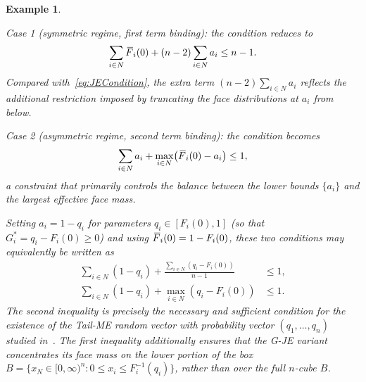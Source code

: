 \documentclass[letterpaper,12pt]{article}
\numberwithin{equation}{section}
\newtheorem{example}[theorem]{Example}
\newcommand{\N}{{N}}
\newcommand{\F}{\,\overline{\kern-0.175em F\kern-0em}}
\begin{document}
{\begin{example}
\begin{itemize}
\noindent\textit{Case 1} (symmetric regime, first term binding): the condition
reduces to
\[
\sum_{i\in\N}\F_i(0)+(n-2)\sum_{i\in\N}a_i\le n-1.
\]
Compared with~\eqref{eq:JECondition}, the extra term $(n-2)\sum_{i\in\N}a_i$
reflects the additional restriction imposed by truncating the face distributions
at $a_i$ from below.

\noindent\textit{Case 2} (asymmetric regime, second term binding): the condition
becomes
\[
\sum_{i\in\N}a_i+\max_{i\in\N}\bigl(\F_i(0)-a_i\bigr)\le 1,
\]
a constraint that primarily controls the balance between the lower bounds
$\{a_i\}$ and the largest effective face mass.

Setting $a_i=1-q_i$ for parameters $q_i\in[F_i(0),1]$ (so that
$G_i^*=q_i-F_i(0)\ge0$) and using $\F_i(0)=1-F_i(0)$, these two conditions
may equivalently be written as
\begin{align*}
\sum_{i\in\N}(1-q_i)
+\frac{\sum_{i\in\N}(q_i-F_i(0))}{n-1}&\le 1,\\
\sum_{i\in\N}(1-q_i)+\max_{i\in\N}(q_i-F_i(0))&\le 1.
\end{align*}
The second inequality is precisely the necessary and sufficient condition for the
existence of the Tail-ME random vector with probability vector $(q_1,\dots,q_n)$
studied in~\cite{Cheung2017}. The first inequality additionally ensures that the
G-JE variant concentrates its face mass on the lower portion of the box
$B=\{x_{\N}\in[0,\infty)^n:0\le x_i\le F_i^{-1}(q_i)\}$, rather than over the
full $n$-cube $B$.


\end{itemize}
\end{example}}
\end{document}
